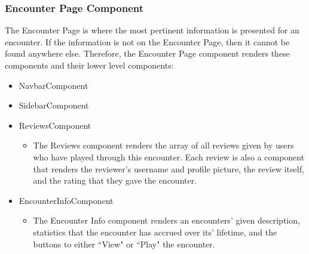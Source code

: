\documentclass[12pt,a4paper]{report}
\begin{document}
		\subsubsection{Encounter Page Component}
		The Encounter Page is where the most pertinent information is presented for an encounter. If the information is not on the Encounter Page, then it cannot be found anywhere else. Therefore, the Encounter Page component renders these components and their lower level components:
		\begin{itemize}
			\item NavbarComponent
			\item SidebarComponent
			\item ReviewsComponent
			\begin{itemize}
				\item The Reviews component renders the array of all reviews given by users who have played through this encounter. Each review is also a component that renders the reviewer's username and profile picture, the review itself, and the rating that they gave the encounter.
			\end{itemize}
			\item EncounterInfoComponent
			\begin{itemize}
				\item The Encounter Info component renders an encounters' given description, statistics that the encounter has accrued over its' lifetime, and the buttons to either ``View" or ``Play" the encounter.
			\end{itemize}
		\end{itemize}
\end{document}
